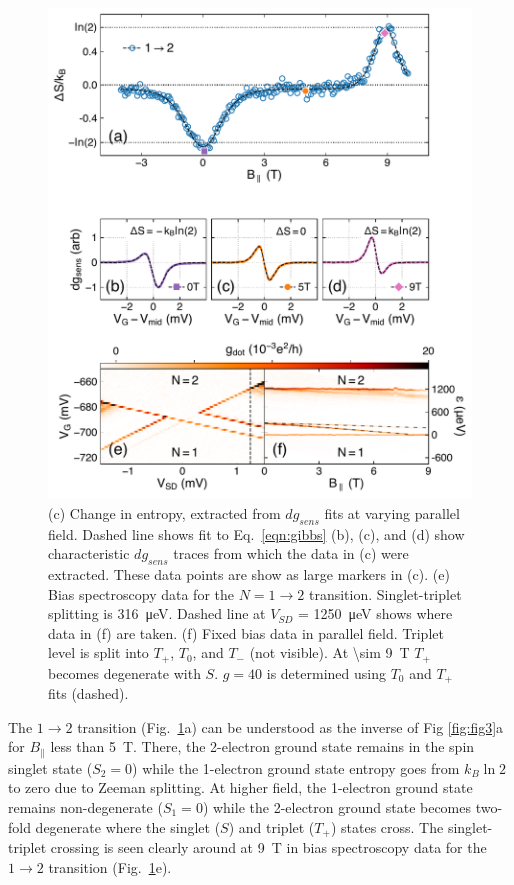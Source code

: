 \documentclass[twocolumn,showpacs,preprintnumbers,amsmath,amssymb,pra,aps,superscriptaddress]{revtex4-1}
\begin{document}
\begin{figure}
        \includegraphics[width=1.0\columnwidth]{../figures/figure_4.pdf}
        \caption{\label{fig:fig4}(c) Change in entropy, extracted from $dg_{sens}$ fits at varying parallel field. Dashed line shows fit to Eq.~\ref{eqn:gibbs} (b), (c), and (d) show characteristic $dg_{sens}$ traces from which the data in (c) were extracted. These data points are show as large markers in (c). (e) Bias spectroscopy data for the $N=1 \rightarrow 2$ transition. Singlet-triplet splitting is \SI{316}{\micro\electronvolt}. Dashed line at $V_{SD}$ = \SI{1250}{\micro\electronvolt} shows where data in (f) are taken. (f) Fixed bias data in parallel field. Triplet level is split into $T_+$, $T_0$, and $T_{-}$ (not visible). At \SI[input-protect-tokens]{\sim 9}{\tesla} $T_+$ becomes degenerate with $S$. $g=40$ is determined using $T_0$ and $T_+$ fits (dashed).}
\end{figure}

The $1\rightarrow 2$ transition (Fig.~\ref{fig:fig4}a) can be understood as the inverse of Fig \ref{fig:fig3}a for $B_\parallel$ less than \SI{5}{\tesla}.  There, the 2-electron ground state remains in the spin singlet state ($S_2=0$) while the 1-electron ground state entropy goes from $k_B\ln{2}$ to zero due to Zeeman splitting. At higher field, the 1-electron ground state remains non-degenerate ($S_1=0$) while the 2-electron ground state becomes two-fold degenerate where the singlet ($S$) and triplet ($T_+$) states cross. The singlet-triplet crossing is seen clearly around at \SI{9}{\tesla} in bias spectroscopy data for the $1\rightarrow 2$ transition (Fig.~\ref{fig:fig4}e). 
\end{document}
